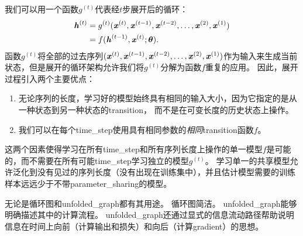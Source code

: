我们可以用一个函数$g^{(t)}$代表经$t$步展开后的循环：
\begin{align}
  \boldsymbol{\mathit{h}}^{(t)} &=g^{(t)}(\boldsymbol{\mathit{x}}^{(t)},\boldsymbol{\mathit{x}}^{(t-1)}, \boldsymbol{\mathit{x}}^{(t-2)},\dots,\boldsymbol{\mathit{x}}^{(2)}, \boldsymbol{\mathit{x}}^{(1)}) \\
  & =  f(\boldsymbol{\mathit{h}}^{(t-1)}, \boldsymbol{\mathit{x}}^{(t)} ; \boldsymbol{\theta}) .
\end{align}
函数$g^{(t)}$将全部的过去序列$(\boldsymbol{\mathit{x}}^{(t)},\boldsymbol{\mathit{x}}^{(t-1)}, \boldsymbol{\mathit{x}}^{(t-2)},\dots,\boldsymbol{\mathit{x}}^{(2)}, \boldsymbol{\mathit{x}}^{(1)})$作为输入来生成当前状态，但是展开的循环架构允许我们将$g^{(t)}$分解为函数$f$重复的应用。
因此，展开过程引入两个主要优点：
\begin{enumerate}
 \item 无论序列的长度，学习好的模型始终具有相同的输入大小，因为它指定的是从一种状态到另一种状态的\gls{transition}， 而不是在可变长度的历史状态上操作。
 \item 我们可以在每个\gls{time_step}使用具有相同参数的\emph{相同}\gls{transition}函数$f$。
\end{enumerate}
这两个因素使得学习在所有\gls{time_step}和所有序列长度上操作的单一模型$f$是可能的，而不需要在所有可能\gls{time_step}学习独立的模型$g^{(t)}$。
学习单一的共享模型允许泛化到没有见过的序列长度（没有出现在训练集中），并且估计模型需要的训练样本远远少于不带\gls{parameter_sharing}的模型。


无论是循环图和\gls{unfolded_graph}都有其用途。
循环图简洁。
\gls{unfolded_graph}能够明确描述其中的计算流程。
\gls{unfolded_graph}还通过显式的信息流动路径帮助说明信息在时间上向前（计算输出和损失）和向后（计算\gls{gradient}）的思想。

